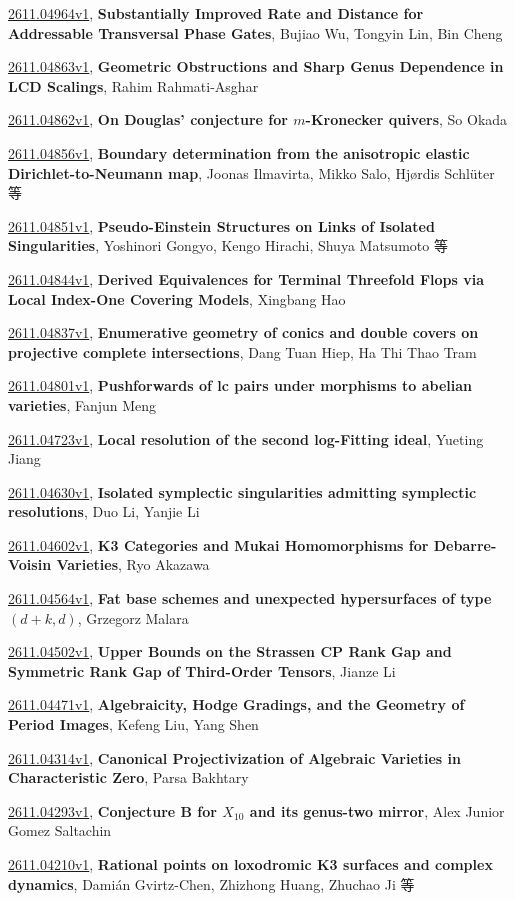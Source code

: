 \documentclass[9pt, a4paper]{article}
\theoremstyle{plain}
\theoremstyle{definition}
\theoremstyle{remark}
\newcommand{\arxiv}[3]{\href{https://arxiv.org/abs/#1}{#1}, \textbf{\textcolor{arxivblue}{#2}}, #3}
\begin{document}
\arxiv{2611.04964v1}{Substantially Improved Rate and Distance for Addressable Transversal Phase Gates}{Bujiao Wu, Tongyin Lin, Bin Cheng}

\arxiv{2611.04863v1}{Geometric Obstructions and Sharp Genus Dependence in LCD Scalings}{Rahim Rahmati-Asghar}

\arxiv{2611.04862v1}{On Douglas' conjecture for $m$-Kronecker quivers}{So Okada}

\arxiv{2611.04856v1}{Boundary determination from the anisotropic elastic Dirichlet-to-Neumann map}{Joonas Ilmavirta, Mikko Salo, Hjørdis Schlüter 等}

\arxiv{2611.04851v1}{Pseudo-Einstein Structures on Links of Isolated Singularities}{Yoshinori Gongyo, Kengo Hirachi, Shuya Matsumoto 等}

\arxiv{2611.04844v1}{Derived Equivalences for Terminal Threefold Flops via Local Index-One Covering Models}{Xingbang Hao}

\arxiv{2611.04837v1}{Enumerative geometry of conics and double covers on projective complete intersections}{Dang Tuan Hiep, Ha Thi Thao Tram}

\arxiv{2611.04801v1}{Pushforwards of lc pairs under morphisms to abelian varieties}{Fanjun Meng}

\arxiv{2611.04723v1}{Local resolution of the second log-Fitting ideal}{Yueting Jiang}

\arxiv{2611.04630v1}{Isolated symplectic singularities admitting symplectic resolutions}{Duo Li, Yanjie Li}

\arxiv{2611.04602v1}{K3 Categories and Mukai Homomorphisms for Debarre-Voisin Varieties}{Ryo Akazawa}

\arxiv{2611.04564v1}{Fat base schemes and unexpected hypersurfaces of type $(d+k,d)$}{Grzegorz Malara}

\arxiv{2611.04502v1}{Upper Bounds on the Strassen CP Rank Gap and Symmetric Rank Gap of Third-Order Tensors}{Jianze Li}

\arxiv{2611.04471v1}{Algebraicity, Hodge Gradings, and the Geometry of Period Images}{Kefeng Liu, Yang Shen}

\arxiv{2611.04314v1}{Canonical Projectivization of Algebraic Varieties in Characteristic Zero}{Parsa Bakhtary}

\arxiv{2611.04293v1}{Conjecture B for $X_{10}$ and its genus-two mirror}{Alex Junior Gomez Saltachin}

\arxiv{2611.04210v1}{Rational points on loxodromic K3 surfaces and complex dynamics}{Damián Gvirtz-Chen, Zhizhong Huang, Zhuchao Ji 等}
\end{document}
